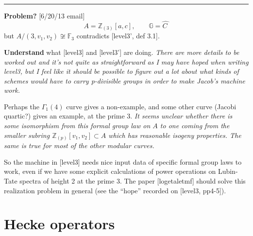 \documentclass{rs}
\theoremstyle{definition}
\theoremstyle{remark}
\newcommand{\mb}[1]{\mathbb{#1}}
\newcommand{\BF}{{\mb F}}
\newcommand{\BG}{{\mb G}}
\newcommand{\BZ}{{\mb Z}}
\newcommand{\HC}{\widehat{C~}\!}
\newcommand{\G}{\Gamma}
\renewcommand{\=}{\approx}
\renewcommand{\-}{\sim}
\numberwithin{equation}{section}
\numberwithin{thm}{section}
\begin{document}
\hrule

\textbf{Problem?} [6/20/13 email] 
\[
A = \BZ_{(3)} [a,c], \qquad \BG = \HC 
\]
but $A / (3,v_1,v_2) \not\cong \BF_3$ contradicts [level3', def 3.1].  

\textbf{Understand} what [level3] and [level3'] are doing.  
{\em There are more details to be worked out and it's not quite as straightforward as I may have hoped when writing level3, 
but I feel like it should be possible to figure out a lot about what kinds of schemes would have to carry p-divisible groups in order to make Jacob's machine work.  }

Perhaps the $\G_1(4)$ curve gives a non-example, and some other curve (Jacobi quartic?) gives an example, at the prime 3.  
{\em It seems unclear whether there is some 
isomorphism from this formal group law on $A$ to one coming from the 
smaller subring $\BZ_{(p)}[v_1,v_2] \subset A$ which has reasonable isogeny 
properties.  The same is true for most of the other modular curves.}  

So the machine in [level3] needs nice input data of specific formal group laws to work, 
even if we have some explicit calculations of power operations on Lubin-Tate spectra of height 2 at the prime 3.  
The paper [logetaletmf] should solve this realization problem in general (see the ``hope'' recorded on [level3, pp4-5]).  


\newpage
\section{Hecke operators}
\label{hecke}
\end{document}
